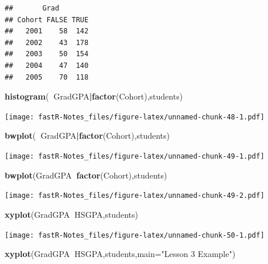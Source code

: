 \documentclass[]{book}
\newenvironment{Shaded}{\begin{snugshade}}{\end{snugshade}}
\newcommand{\KeywordTok}[1]{\textcolor[rgb]{0.13,0.29,0.53}{\textbf{#1}}}
\newcommand{\DataTypeTok}[1]{\textcolor[rgb]{0.13,0.29,0.53}{#1}}
\newcommand{\StringTok}[1]{\textcolor[rgb]{0.31,0.60,0.02}{#1}}
\newcommand{\OperatorTok}[1]{\textcolor[rgb]{0.81,0.36,0.00}{\textbf{#1}}}
\newcommand{\NormalTok}[1]{#1}
\theoremstyle{definition}
\theoremstyle{definition}
\theoremstyle{definition}
\theoremstyle{remark}
\begin{document}
\begin{verbatim}
##       Grad
## Cohort FALSE TRUE
##   2001    58  142
##   2002    43  178
##   2003    50  154
##   2004    47  140
##   2005    70  118
\end{verbatim}

\begin{Shaded}
\begin{Highlighting}[]
\KeywordTok{histogram}\NormalTok{(}\OperatorTok{~}\NormalTok{GradGPA}\OperatorTok{|}\KeywordTok{factor}\NormalTok{(Cohort),students)}
\end{Highlighting}
\end{Shaded}

\texttt{[image: fastR-Notes\_files/figure-latex/unnamed-chunk-48-1.pdf]}

\begin{Shaded}
\begin{Highlighting}[]
\KeywordTok{bwplot}\NormalTok{(}\OperatorTok{~}\NormalTok{GradGPA}\OperatorTok{|}\KeywordTok{factor}\NormalTok{(Cohort),students)}
\end{Highlighting}
\end{Shaded}

\texttt{[image: fastR-Notes\_files/figure-latex/unnamed-chunk-49-1.pdf]}

\begin{Shaded}
\begin{Highlighting}[]
\KeywordTok{bwplot}\NormalTok{(GradGPA}\OperatorTok{~}\KeywordTok{factor}\NormalTok{(Cohort),students)}
\end{Highlighting}
\end{Shaded}

\texttt{[image: fastR-Notes\_files/figure-latex/unnamed-chunk-49-2.pdf]}

\begin{Shaded}
\begin{Highlighting}[]
\KeywordTok{xyplot}\NormalTok{(GradGPA}\OperatorTok{~}\NormalTok{HSGPA,students)}
\end{Highlighting}
\end{Shaded}

\texttt{[image: fastR-Notes\_files/figure-latex/unnamed-chunk-50-1.pdf]}

\begin{Shaded}
\begin{Highlighting}[]
\KeywordTok{xyplot}\NormalTok{(GradGPA}\OperatorTok{~}\NormalTok{HSGPA,students,}\DataTypeTok{main=}\StringTok{"Lesson 3 Example"}\NormalTok{)}
\end{Highlighting}
\end{Shaded}
\end{document}
